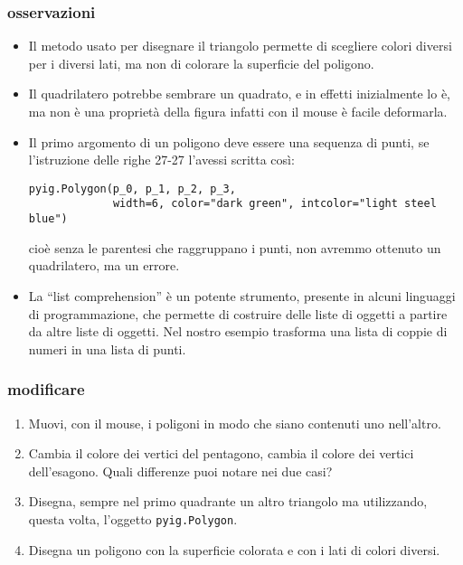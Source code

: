 \subsubsection{osservazioni}

\begin{itemize}
 \item Il metodo usato per disegnare il triangolo permette di scegliere colori 
diversi per i diversi lati, ma non di colorare la superficie del poligono.
 \item Il quadrilatero potrebbe sembrare un quadrato, e in effetti inizialmente 
lo è, ma non è una proprietà della figura infatti con il mouse è facile 
deformarla.
 \item 
Il primo argomento di un poligono deve essere una sequenza di punti, se 
l'istruzione delle righe 27-27 l'avessi scritta così:
\begin{lstlisting}[firstnumber=27]
pyig.Polygon(p_0, p_1, p_2, p_3,
             width=6, color="dark green", intcolor="light steel blue")
\end{lstlisting}
cioè senza le parentesi che raggruppano i punti, non avremmo ottenuto un 
quadrilatero, ma un errore.
 \item La ``list comprehension'' è un potente strumento, presente in alcuni 
linguaggi di programmazione, che permette di costruire delle liste di oggetti a 
partire da altre liste di oggetti. Nel nostro esempio trasforma una lista di 
coppie di numeri in una lista di punti.
\end{itemize}

\subsubsection{modificare}

\begin{enumerate} [noitemsep]
 \item Muovi, con il mouse, i poligoni in modo che siano contenuti uno 
nell'altro.
 \item Cambia il colore dei vertici del pentagono, cambia il colore dei vertici 
dell'esagono. Quali differenze puoi notare nei due casi?
 \item Disegna, sempre nel primo quadrante un altro triangolo ma utilizzando, 
questa volta, l'oggetto \lstinline{pyig.Polygon}.
 \item Disegna un poligono con la superficie colorata e con i lati di colori 
diversi.
\end{enumerate}

